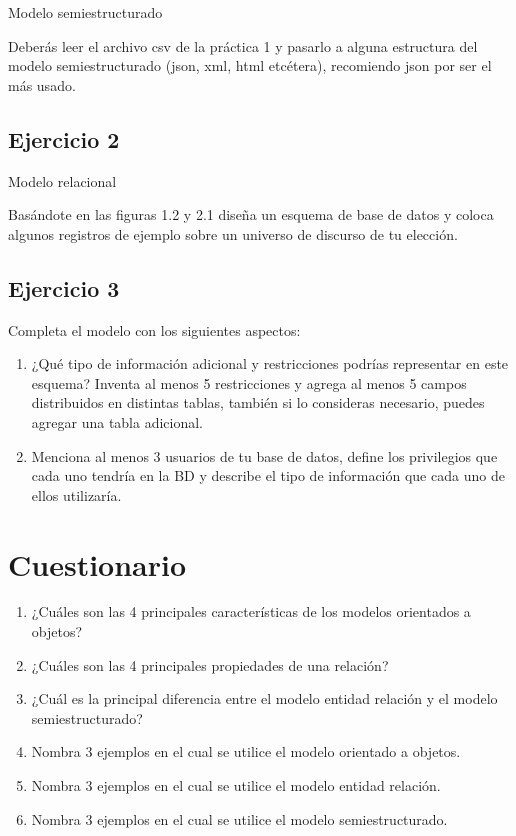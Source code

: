 \documentclass[a4paper,12pt]{article}
\begin{document}
Modelo semiestructurado

Deberás leer el archivo csv de la práctica 1 y pasarlo a alguna estructura del modelo
semiestructurado (json, xml, html etcétera), recomiendo json por ser el más usado.


\subsection*{Ejercicio 2}

Modelo relacional

Basándote en las figuras 1.2 y 2.1 diseña un esquema de base de datos y coloca algunos
registros de ejemplo sobre un universo de discurso de tu elección.

\subsection*{Ejercicio 3}

Completa el modelo con los siguientes aspectos:

\begin{enumerate}
    \item ¿Qué tipo de información adicional y restricciones podrías representar en este
    esquema? Inventa al menos 5 restricciones y agrega al menos 5 campos distribuidos
    en distintas tablas, también si lo consideras necesario, puedes agregar una tabla
    adicional.

    \item Menciona al menos 3 usuarios de tu base de datos, define los privilegios que cada
    uno tendría en la BD y describe el tipo de información que cada uno de ellos
    utilizaría.
\end{enumerate}


\section*{Cuestionario}

\begin{enumerate}
    \item ¿Cuáles son las 4 principales características de los modelos orientados a objetos?
    \item ¿Cuáles son las 4 principales propiedades de una relación?
    \item ¿Cuál es la principal diferencia entre el modelo entidad relación y el modelo
    semiestructurado?
    \item Nombra 3 ejemplos en el cual se utilice el modelo orientado a objetos.
    \item Nombra 3 ejemplos en el cual se utilice el modelo entidad relación.
    \item Nombra 3 ejemplos en el cual se utilice el modelo semiestructurado.    
\end{enumerate}





\end{document}
